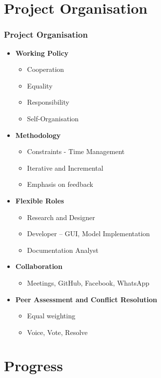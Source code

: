 \documentclass{beamer}
\begin{document}
\section{Project Organisation}

\begin{frame}
\frametitle{Project Organisation}

\begin{itemize}
\item \textbf{Working Policy}
	\begin{itemize}
		\item Cooperation
		\item Equality
		\item Responsibility
		\item Self-Organisation
	\end{itemize}
\item \textbf{Methodology}
	\begin{itemize}
		\item Constraints - Time Management
		\item Iterative and Incremental
		\item Emphasis on feedback
	\end{itemize}
\item \textbf{Flexible Roles}
	\begin{itemize}
		\item Research and Designer
		\item Developer – GUI, Model Implementation
		\item Documentation Analyst
	\end{itemize}
\item \textbf{Collaboration}
	\begin{itemize}
		\item Meetings, GitHub, Facebook, WhatsApp
	\end{itemize}	
\item \textbf{Peer Assessment and Conflict Resolution}
	\begin{itemize}
		\item Equal weighting
		\item Voice, Vote, Resolve
	\end{itemize}	
\end{itemize}

\end{frame}

\section{Progress}
\end{document}
